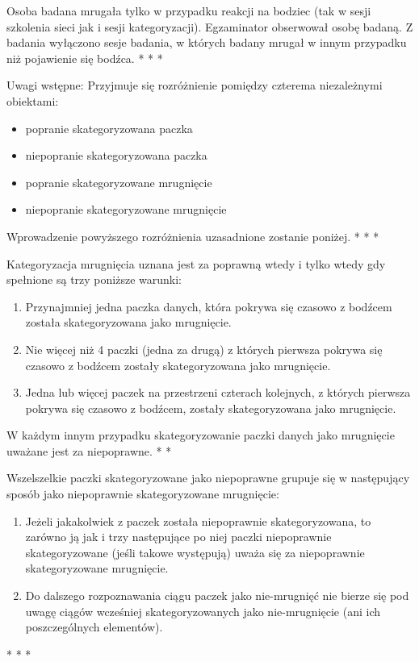 \documentclass{article}
\begin{document}
    Osoba badana mrugała tylko w przypadku reakcji na bodziec (tak w sesji szkolenia sieci jak i sesji kategoryzacji).
    Egzaminator obserwował osobę badaną. Z badania wyłączono sesje badania, w których badany mrugał w innym przypadku niż pojawienie się bodźca.
    \newline
    * * *

    Uwagi wstępne: 
    Przyjmuje się rozróżnienie pomiędzy czterema niezależnymi obiektami:
    \begin{itemize}
        \item popranie skategoryzowana paczka
        \item niepopranie skategoryzowana paczka
        \item popranie skategoryzowane mrugnięcie
        \item niepopranie skategoryzowane mrugnięcie
    \end{itemize}
    Wprowadzenie powyższego rozróżnienia uzasadnione zostanie poniżej.
    \newline
    * * *

    Kategoryzacja mrugnięcia uznana jest za poprawną wtedy i tylko wtedy gdy spełnione są trzy poniższe warunki:
    \begin{enumerate}
        \item Przynajmniej jedna paczka danych, która pokrywa się czasowo z bodźcem została skategoryzowana jako mrugnięcie.
        \item Nie więcej niż 4 paczki (jedna za drugą) z których pierwsza pokrywa się czasowo z bodźcem zostały skategoryzowana jako mrugnięcie.
        \item Jedna lub więcej paczek na przestrzeni czterach kolejnych, z których pierwsza pokrywa się czasowo z bodźcem, zostały skategoryzowana jako mrugnięcie.
    \end{enumerate}
    W każdym innym przypadku skategoryzowanie paczki danych jako mrugnięcie uważane jest za niepoprawne.
    \newline
    * *
   
    Wszelszelkie paczki skategoryzowane jako niepoprawne grupuje się w następujący sposób jako niepoprawnie skategoryzowane mrugnięcie:
    \begin{enumerate}
        \item Jeżeli jakakolwiek z paczek została niepoprawnie skategoryzowana, to zarówno ją jak i trzy następujące po niej paczki niepoprawnie skategoryzowane (jeśli takowe występują) uważa się za niepoprawnie skategoryzowane mrugnięcie.
        \item Do dalszego rozpoznawania ciągu paczek jako nie-mrugnięć nie bierze się pod uwagę ciągów wcześniej skategoryzowanych jako nie-mrugnięcie (ani ich poszczególnych elementów).
    \end{enumerate}
    * * *
    
\end{document}
